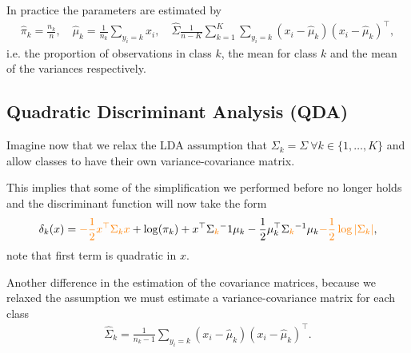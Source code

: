 \documentclass[aspectratio=169,10pt]{beamer}
\begin{document}
\begin{frame}{\secname}{\subsecname}
  In practice the parameters are estimated by
  \begin{align}
    \hat{\pi}_k = \frac{n_k}{n}, \quad \hat{\mu}_k = \frac{1}{n_k}\sum_{y_i=k}x_i, \quad \hat{\Sigma} \frac{1}{n-K}\sum_{k=1}^K\sum_{y_i=k}(x_i - \hat{\mu}_k)(x_i - \hat{\mu}_k)^\top,
  \end{align}
  i.e.\! the proportion of observations in class $k$, the mean for class $k$ and the mean of the variances respectively.
\end{frame}

\subsection{Quadratic Discriminant Analysis (QDA)}
\begin{frame}{\secname}{\subsecname}
  Imagine now that we relax the LDA assumption that $\Sigma_k = \Sigma \ \forall k \in \{1,\ldots,K\}$ and allow classes to have their own variance-covariance matrix.

  This implies that some of the simplification we performed before no longer holds and the discriminant function will now take the form
  \begin{align}
    \delta_k(x) = {\color{orange}-\frac{1}{2} x^\top\Sigma_kx} + \log(\pi_k) + x^\top \Sigma{\color{orange}_k}^-1 \mu_k - \frac{1}{2}\mu_k^\top \Sigma{\color{orange}_k}^{-1} \mu_k {\color{orange}- \frac{1}{2}\log|\Sigma_k|},
  \end{align}
  note that first term is quadratic in $x$.

  Another difference in the estimation of the covariance matrices, because we relaxed the assumption we must estimate a variance-covariance matrix for each class
  \begin{align}
    \hat{\Sigma}_k = \frac{1}{n_k - 1} \sum_{y_i = k} (x_i - \hat{\mu}_k)(x_i - \hat{\mu}_k)^\top.
  \end{align}
\end{frame}
\end{document}

